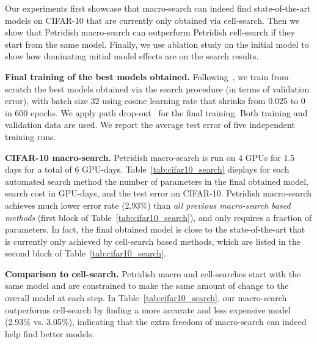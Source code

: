 \documentclass{article}
\newcommand{\Petridish}{Petridish\xspace}
\begin{document}
Our experiments first showcase that macro-search can indeed find state-of-the-art models on CIFAR-10 that are currently only obtained via cell-search. Then we show that \Petridish macro-search can outperform \Petridish cell-search if they start from the same model. Finally, we use ablation study on the initial model to show how dominating initial model effects are on the search results.  

\textbf{Final training of the best models obtained.} 
Following~\citep{NAS,NASCell,Real2018RegularizedEF}, we train from scratch the best models obtained via the search procedure (in terms of validation error), with batch size 32 using cosine learning rate that shrinks from 0.025 to 0 in 600 epochs. We apply path drop-out~\citep{larsson2016fractalnet} for the final training. Both training and validation data are used. We report the average test error of five independent training runs.

\textbf{CIFAR-10 macro-search.}
\Petridish macro-search is run on 4 GPUs for 1.5 days for a total of 6 GPU-days.
Table~\ref{tab:cifar10_search} displays for each automated search method the number of parameters in the final obtained model, search cost in GPU-days, and the test error on CIFAR-10. \Petridish macro-search achieves much lower error rate (2.93\%) than \emph{all  previous macro-search based methods} (first block of Table~\ref{tab:cifar10_search}), and only requires a fraction of parameters. In fact, the final obtained model is close to the state-of-the-art that is currently only achieved by cell-search based methods, which are listed in the second block of Table~\ref{tab:cifar10_search}.

\textbf{Comparison to cell-search.}
\Petridish macro and cell-searches start with the same model and are constrained to make the same amount of change to the overall model at each step. In Table~\ref{tab:cifar10_search}, our macro-search outperforms cell-search by finding a more accurate and less expensive model (2.93\% vs. 3.05\%), indicating that the extra freedom of macro-search can indeed help find better models.


\end{document}
